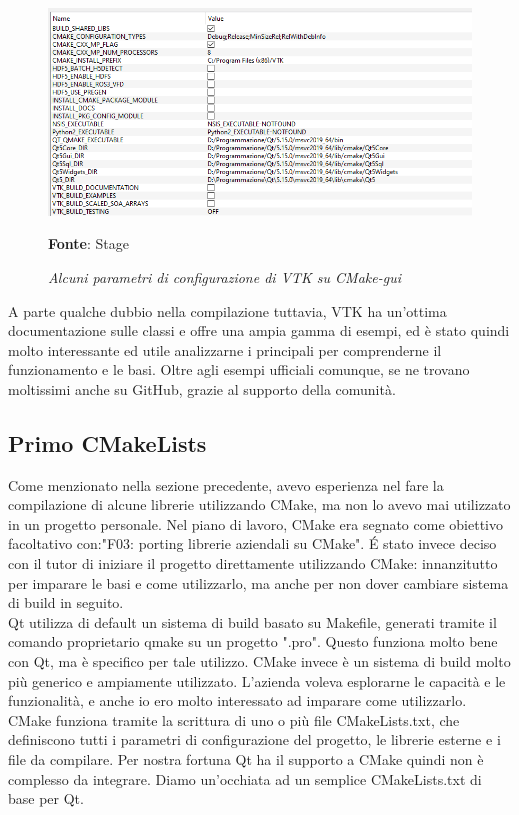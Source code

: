 \begin{figure}[h]
    \centering
    \includegraphics[width=1\textwidth]{immagini/svolgimento/vtkcmake.png}
    \caption{\textit{Alcuni parametri di configurazione di VTK su CMake-gui}}
    \textbf{Fonte}: Stage
    \label{fig: VTK CMAKE}
\end{figure}

A parte qualche dubbio nella compilazione tuttavia, VTK ha un'ottima documentazione sulle classi e offre una ampia gamma di esempi, ed è stato quindi molto interessante ed utile analizzarne i principali per comprenderne il funzionamento e le basi. Oltre agli esempi ufficiali comunque, se ne trovano moltissimi anche su GitHub, grazie al supporto della comunità.

\subsection{Primo CMakeLists}\label{sec:primo-cmake}
Come menzionato nella sezione precedente, avevo esperienza nel fare la compilazione di alcune librerie utilizzando CMake, ma non lo avevo mai utilizzato in un progetto personale. Nel piano di lavoro, CMake era segnato come obiettivo facoltativo con:"F03: porting librerie aziendali su CMake". \'E stato invece deciso con il tutor di iniziare il progetto direttamente utilizzando CMake: innanzitutto per imparare le basi e come utilizzarlo, ma anche per non dover cambiare sistema di build in seguito.
\\
Qt utilizza di default un sistema di build basato su Makefile, generati tramite il comando proprietario qmake su un progetto ".pro". Questo funziona molto bene con Qt, ma è specifico per tale utilizzo. CMake invece è un sistema di build molto più generico e ampiamente utilizzato. L'azienda voleva esplorarne le capacità e le funzionalità, e anche io ero molto interessato ad imparare come utilizzarlo. CMake funziona tramite la scrittura di uno o più file CMakeLists.txt, che definiscono tutti i parametri di configurazione del progetto, le librerie esterne e i file da compilare. Per nostra fortuna Qt ha il supporto a CMake quindi non è complesso da integrare. Diamo un'occhiata ad un semplice CMakeLists.txt di base per Qt.

